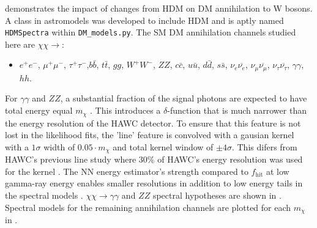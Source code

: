  demonstrates the impact of changes from HDM on DM
annihilation to W bosons.
A class in astromodels was developed to include HDM and is aptly named \texttt{HDMSpectra} within \texttt{DM\_models.py}.
The SM DM annihilation channels studied here are $\chi\chi \rightarrow$:
\begin{itemize}
    \item[] $e^+e^-$, $\mu^+\mu^-$, $\tau^+\tau^-$,$b\bar{b}$, $t\bar{t}$, $gg$, $W^+W^-$, $ZZ$, $c\bar{c}$, $u\bar{u}$, $d\bar{d}$, $s\bar{s}$, $\nu_e \overline{\nu_e}$, $\nu_\mu \overline{\nu_\mu}$, $\nu_\tau \overline{\nu_\tau}$, $\gamma\gamma$, $hh$.
\end{itemize}
For $\gamma\gamma$ and $ZZ$, a substantial fraction of the signal photons are expected to have total energy equal $m_\chi$ \cite{HDMSpectra}.
This introduces a $\delta$-function that is much narrower than the energy resolution of the HAWC detector.
To ensure that this feature is not lost in the likelihood fits, the 'line' feature is convolved with a gausian kernel with a $1\sigma$ width of $0.05 \cdot m_\chi$ and total kernel window of $\pm4\sigma$.
This difers from HAWC's previous line study where 30\% of HAWC's energy resolution was used for the kernel \cite{HAWC_dm_gammalines}.
The NN energy estimator's strength compared to $f_\mathrm{hit}$ at low gamma-ray energy enables smaller resolutions in addition to low energy tails in the spectral models \cite{HDMSpectra}.
$\chi\chi \rightarrow \gamma\gamma$ and $ZZ$ spectral hypotheses are shown in .
Spectral models for the remaining annihilation channels are plotted for each $m_\chi$ in .

